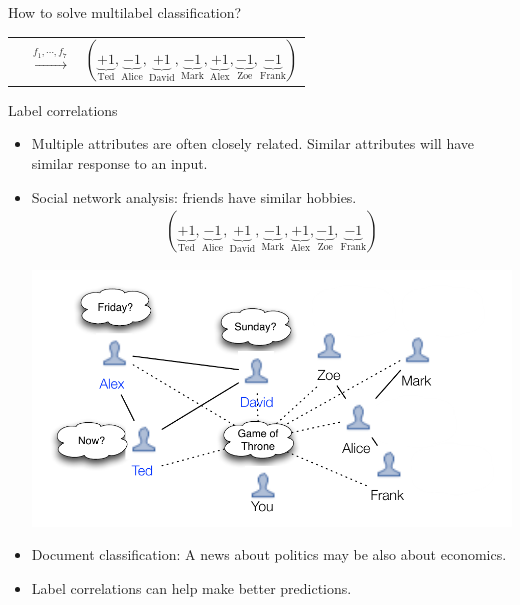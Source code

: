 \documentclass[first=purple,second=dgreen,logo=redexc]{aaltoslides}
\begin{document}
{\begin{frame}{How to solve multilabel classification?}
{\begin{tabular}{p{1.5cm}p{0.5cm}p{3cm}}
	& $\overset{f_1,\cdots,f_7}{\rightarrow}$ &$(\underbrace{+1}_{\text{Ted}},\underbrace{-1}_{\text{Alice}},\underbrace{+1}_{\text{David}},\underbrace{-1}_{\text{Mark}},\underbrace{+1}_{\text{Alex}},\underbrace{-1}_{\text{Zoe}},\underbrace{-1}_{\text{Frank}})$\\
    \end{tabular}
	}
	
	
	
\end{frame}


\begin{frame}{Label correlations}
	\begin{itemize}
		\item Multiple attributes are often closely related. Similar attributes will have similar response to an input.
		\item Social network analysis: friends have similar hobbies.
		\begin{align*}
	(\underbrace{+1}_{\text{Ted}},\underbrace{-1}_{\text{Alice}},\underbrace{+1}_{\text{David}},\underbrace{-1}_{\text{Mark}},\underbrace{+1}_{\text{Alex}},\underbrace{-1}_{\text{Zoe}},\underbrace{-1}_{\text{Frank}})
		\end{align*}
		\begin{center}
			\includegraphics[scale=0.5]{./figures/facebooknetwork.pdf}
		\end{center}
		\item Document classification: A news about politics may be also about economics. 
		\item Label correlations can help make better predictions.
	\end{itemize}
\end{frame}


}
\end{document}
